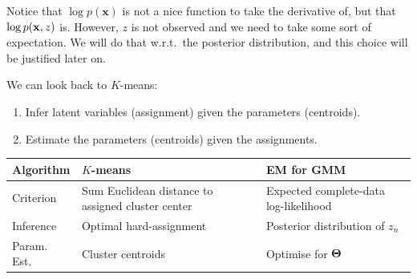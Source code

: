 Notice that $\log p(\mathbf{x})$ is not a nice function to take the derivative of, but that $\log p(\boldsymbol{\mathbf{x}},z)$ is. However, $z$ is not observed and we need to take some sort of expectation. We will do that w.r.t.\ the posterior distribution, and this choice will be justified later on.\vspace{2mm}\\
\vspace{3mm}


  We can look back to $K$-means:
 \begin{enumerate}
  \item Infer latent variables (assignment) given the parameters (centroids).
  \item Estimate the parameters (centroids) given the assignments.
 \end{enumerate} 

\begin{tabular}{lll}
 \toprule
  Algorithm & $K$-means & EM for GMM \\
  \midrule
  Criterion & Sum Euclidean distance to assigned cluster center & Expected complete-data log-likelihood \\
  Inference & Optimal hard-assignment & Posterior distribution of $z_n$ \\
  Param. Est. & Cluster centroids & Optimise for $\boldsymbol{\mathbf{\Theta}}$ \\
  \bottomrule
\end{tabular}\vspace{5mm}


